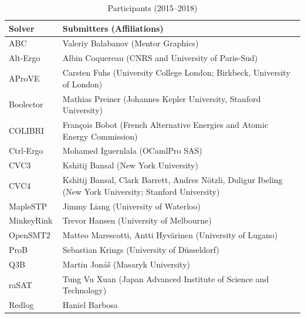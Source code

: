 \documentclass[dvipsnames,table,twoside,11pt]{article}
\begin{document}
\begin{table}
  \caption{Participants (2015--2018)}
  \label{table:participants}
  \centering
  \begin{tabular}{lp{11.5cm}}
    \toprule
    Solver & Submitters (Affiliations)\\
    \midrule
    ABC~\cite{DBLP:conf/cav/BraytonM10} & Valeriy Balabanov
                        (Mentor Graphics)\\
    Alt-Ergo~\cite{conchon:hal-01960203} & Albin Coquereau
                        (CNRS and University of Paris-Sud)\\
    AProVE~\cite{DBLP:journals/jar/GieslABEFFHOPSS17} & Carsten Fuhs
                        (University College London; Birkbeck, University of London)\\
    Boolector~\cite{DBLP:conf/cav/NiemetzPWB18} & Mathias Preiner
                        (Johannes Kepler University, Stanford University)\\
    COLIBRI~\cite{colibri} & Fran\c{c}ois Bobot
                        (French Alternative Energies and Atomic Energy Commission)\\
    Ctrl-Ergo~\cite{10.1007/978-3-642-31365-3_8} & Mohamed Iguernlala
                        (OCamlPro SAS)\\
    CVC3~\cite{DBLP:conf/cav/BarrettT07} & Kshitij Bansal
                        (New York University)\\
    CVC4~\cite{DBLP:conf/cav/BarrettCDHJKRT11}  & Kshitij Bansal, Clark Barrett, Andres N\"otzli, Duligur Ibeling
                        (New York University; Stanford University)\\
    MapleSTP          & Jimmy Liang
                        (University of Waterloo)\\
    MinkeyRink        & Trevor Hansen
                        (University of Melbourne)\\
    OpenSMT2~\cite{DBLP:conf/sat/HyvarinenMAS16} & Matteo Marescotti, Antti Hyv\"arinen
                        (University of Lugano)\\
    ProB~\cite{doi:10.1002/9781119002727.ch14} & Sebastian Krings
                        (University of D\"usseldorf)\\
    Q3B               & Martin Jon\'a\v{s}
                        (Masaryk University)\\
    raSAT~\cite{rasat} & Tung Vu Xuan
                        (Japan Advanced Institute of Science and Technology)\\
    Redlog~\cite{DBLP:journals/cca/Dolzmann097} & Haniel Barbosa

\end{tabular}
\end{table}
\end{document}
